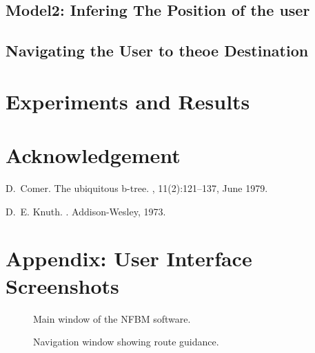 \documentclass[a4paper]{article}
\begin{document}
\subsection{Model2: Infering The Position of the user}

\subsection{Navigating the User to theoe Destination}

\section{Experiments and Results}

\section{Acknowledgement}



% 
%

\begin{thebibliography}{Com79}

D.~Comer.
\newblock The ubiquitous b-tree.
, 11(2):121--137, June 1979.

D.~E. Knuth.
.
\newblock Addison-Wesley, 1973.

\end{thebibliography}

\clearpage
\appendix
\section*{Appendix: User Interface Screenshots}

\begin{figure}[h!]
    \centering
    \caption{Main window of the NFBM software.}
\end{figure}

\begin{figure}[h!]
    \centering
    \caption{Navigation window showing route guidance.}
\end{figure}

\end{document}
